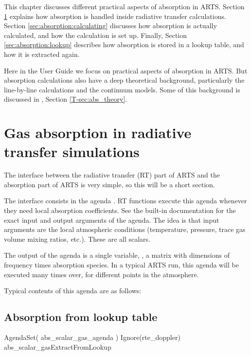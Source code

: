 This chapter discusses different practical aspects of absorption in
ARTS. Section \ref{sec:absorption:abs-rt} explains how absorption is
handled inside radiative transfer calculations.  Section
\ref{sec:absorption:calculating} discusses how absorption is actually
calculated, and how the calculation is set up.  Finally, Section
\ref{sec:absorption:lookup} describes how absorption is stored in a
lookup table, and how it is extracted again.

Here in the User Guide we focus on practical aspects of absorption in
ARTS.  But absorption calculations also have a deep theoretical
background, particularly the line-by-line calculations and the
continuum models.  Some of this background is discussed in \theory,
Section \ref{T-sec:abs_theory}. 

\section{Gas absorption in radiative transfer simulations}
\label{sec:absorption:abs-rt}

The interface between the radiative transfer (RT) part of ARTS and the
absorption part of ARTS is very simple, so this will be a short
section.

The interface consists in the agenda
.  RT functions execute this agenda
whenever they need local absorption coefficients.  See the built-in
documentation for the exact input and output arguments of the agenda.
The idea is that input arguments are the local atmospheric conditions
(temperature, pressure, trace gas volume mixing ratios, etc.).  These
are all scalars.

The output of the agenda is a single variable,
, a matrix with dimensions of frequency
times absorption species.  In a typical ARTS run, this agenda will be
executed many times over, for different points in the atmosphere.

Typical contents of this agenda are as follows:

\subsection{Absorption from lookup table}

\begin{code}
AgendaSet( abs_scalar_gas_agenda )
{
  Ignore(rte_doppler)
  abs_scalar_gasExtractFromLookup
}
\end{code}

